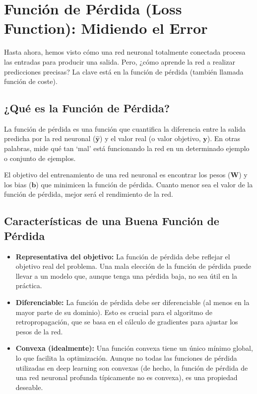 \documentclass{article}
\begin{document}
\section{Función de Pérdida (Loss Function): Midiendo el Error}

Hasta ahora, hemos visto cómo una red neuronal totalmente conectada procesa las entradas para producir una salida. Pero, ¿cómo aprende la red a realizar predicciones precisas?  La clave está en la función de pérdida (también llamada función de coste).

\subsection{¿Qué es la Función de Pérdida?}

La función de pérdida es una función que cuantifica la diferencia entre la salida predicha por la red neuronal (\(\hat{\mathbf{y}}\)) y el valor real (o valor objetivo, \(\mathbf{y}\)).  En otras palabras, mide qué tan `mal' está funcionando la red en un determinado ejemplo o conjunto de ejemplos.

El objetivo del entrenamiento de una red neuronal es encontrar los pesos (\(\mathbf{W}\)) y los bias (\(\mathbf{b}\)) que minimicen la función de pérdida.  Cuanto menor sea el valor de la función de pérdida, mejor será el rendimiento de la red.

\subsection{Características de una Buena Función de Pérdida}

\begin{itemize}
    \item \textbf{Representativa del objetivo:} La función de pérdida debe reflejar el objetivo real del problema.  Una mala elección de la función de pérdida puede llevar a un modelo que, aunque tenga una pérdida baja, no sea útil en la práctica.
    \item \textbf{Diferenciable:} La función de pérdida debe ser diferenciable (al menos en la mayor parte de su dominio).  Esto es crucial para el algoritmo de retropropagación, que se basa en el cálculo de gradientes para ajustar los pesos de la red.
    \item \textbf{Convexa (idealmente):} Una función convexa tiene un único mínimo global, lo que facilita la optimización.  Aunque no todas las funciones de pérdida utilizadas en deep learning son convexas (de hecho, la función de pérdida de una red neuronal profunda típicamente no es convexa), es una propiedad deseable.
\end{itemize}
\end{document}
